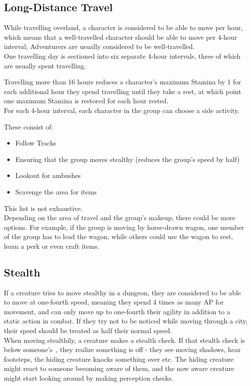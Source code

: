 \subsection{Long-Distance Travel}\label{subsec:longDistanceTravel}
While travelling overland, a character is considered to be able to move  per hour, which means that a well-travelled character should be able to move  per 4-hour interval;
Adventurers are usually considered to be well-travelled.\\

One travelling day is sectioned into six separate 4-hour intervals, three of which are usually spent travelling.

Travelling more than 16 hours reduces a character's maximum Stamina by 1 for each additional hour they spend travelling until they take a rest, at which point one maximum Stamina is restored for each hour rested.\\

For each 4-hour interval, each character in the group can choose a side activity.

These consist of:

\begin{itemize}
	\item Follow Tracks

	\item Ensuring that the group moves stealthy (reduces the group's speed by half)

	\item Lookout for ambushes

	\item Scavenge the area for items

\end{itemize}
This list is not exhaustive.\\

Depending on the area of travel and the group's makeup, there could be more options.
For example, if the group is moving by horse-drawn wagon, one member of the group has to lead the wagon, while others could use the wagon to rest, learn a perk or even craft items.

\subsection{Stealth}\label{subsec:stealth}
If a creature tries to move stealthy in a dungeon, they are considered to be able to move at one-fourth speed, meaning they spend 4 times as many AP for movement, and can only move up to one-fourth their agility in addition to a static action in combat.
If they try not to be noticed while moving through a city, their speed should be treated as half their normal speed.\\
When moving stealthily, a creature makes a stealth check.
If that stealth check is below someone's~, they realize something is off - they see moving shadows, hear footsteps, the hiding creature knocks something over etc.
The hiding creature might react to someone becoming aware of them, and the now aware creature might start looking around by making perception checks.

